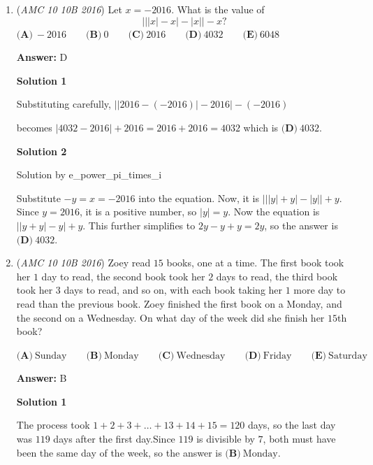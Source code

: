 \begin{enumerate}
 


 


	\item (\textit{AMC 10 10B 2016}) Let $x=-2016$. What is the value of 
 \[\bigg| \big||x|-x\big|-|x| \bigg| -x?\]
$\textbf{(A)}\ -2016\qquad\textbf{(B)}\ 0\qquad\textbf{(C)}\ 2016\qquad\textbf{(D)}\ 4032\qquad\textbf{(E)}\ 6048$

 \textbf{Answer: }D



\textbf{Solution 1}

Substituting carefully, $\Bigg\vert\Big\vert 2016-(-2016)\Big\vert-2016\Bigg\vert-(-2016)$

 becomes $|4032-2016|+2016=2016+2016=4032$ which is $\boxed{\textbf{(D)} ~ 4032}$.

 



\textbf{Solution 2}

Solution by e\_power\_pi\_times\_i

 Substitute $-y = x = -2016$ into the equation. Now, it is $\Bigg\vert\Big\vert |y|+y\Big\vert-|y|\Bigg\vert+y$. Since $y = 2016$, it is a positive number, so $|y| = y$. Now the equation is $\Bigg\vert\Big\vert y+y\Big\vert-y\Bigg\vert+y$. This further simplifies to $2y-y+y = 2y$, so the answer is $\boxed{\textbf{(D)}\ 4032}$.

 


 


	\item (\textit{AMC 10 10B 2016}) Zoey read $15$ books, one at a time. The first book took her $1$ day to read, the second book took her $2$ days to read, the third book took her $3$ days to read, and so on, with each book taking her $1$ more day to read than the previous book. Zoey finished the first book on a Monday, and the second on a Wednesday. On what day of the week did she finish her $15$th book?


 $\textbf{(A)}\ \text{Sunday}\qquad\textbf{(B)}\ \text{Monday}\qquad\textbf{(C)}\ \text{Wednesday}\qquad\textbf{(D)}\ \text{Friday}\qquad\textbf{(E)}\ \text{Saturday}$

 \textbf{Answer: }B



\textbf{Solution 1}

The process took $1+2+3+\ldots+13+14+15=120$ days, so the last day was $119$ days after the first day.Since $119$ is divisible by $7$, both must have been the same day of the week, so the answer is $\boxed{\textbf{(B)}\ \text{Monday}}$.


\end{enumerate}
